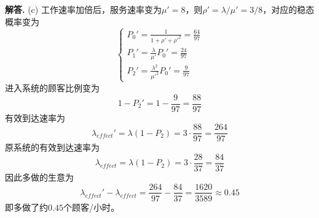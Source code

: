 \documentclass[12pt, a4paper, oneside]{ctexart}
\newenvironment{solution}[1][]{\par\noindent\textbf{#1解答. }}{\smallskip\par}  %
\begin{document}
\begin{solution}
    (c) 工作速率加倍后，服务速率变为$\mu' = 8$，则$\rho' = \lambda /\mu' = 3/8$，对应的稳态概率变为
    \begin{equation*}
        \begin{cases}
            P_0' = \frac{1}{1+\rho'+\rho'^2} = \frac{64}{97} \\
            P_1' = \frac{\lambda}{\mu'}P_0' = \frac{24}{97} \\
            P_2' = \frac{\lambda^2}{\mu'^2}P_0' = \frac{9}{97}
        \end{cases}
    \end{equation*}
    进入系统的顾客比例变为
    \begin{equation*}
        1 - P_2' = 1 - \frac{9}{97} = \frac{88}{97}
    \end{equation*}
    有效到达速率为
    \begin{equation*}
        \lambda_{effect}' = \lambda(1-P_2) = 3\cdot\frac{88}{97} = \frac{264}{97}
    \end{equation*}
    原系统的有效到达速率为
    \begin{equation*}
        \lambda_{effect} = \lambda(1-P_2) = 3\cdot\frac{28}{37} = \frac{84}{37}
    \end{equation*}
    因此多做的生意为
    \begin{equation*}
        \lambda_{effect}' - \lambda_{effect} = \frac{264}{97} - \frac{84}{37} = \frac{1620}{3589}\approx 0.45
    \end{equation*}
    即多做了约$0.45$个顾客/小时。
\end{solution}
\end{document}

